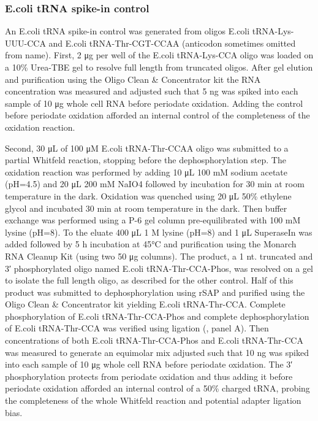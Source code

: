 \documentclass[9pt,lineno]{elife}
\begin{document}
\subsubsection{E.coli tRNA spike-in control}
An E.coli tRNA spike-in control was generated from oligos E.coli tRNA-Lys-UUU-CCA and E.coli tRNA-Thr-CGT-CCAA (anticodon sometimes omitted from name).
First, 2 μg per well of the E.coli tRNA-Lys-CCA oligo was loaded on a 10\% Urea-TBE gel to resolve full length from truncated oligos.
After gel elution and purification using the Oligo Clean \& Concentrator kit the RNA concentration was measured and adjusted such that 5 ng was spiked into each sample of 10 μg whole cell RNA before periodate oxidation.
Adding the control before periodate oxidation afforded an internal control of the completeness of the oxidation reaction.

Second, 30 μL of 100 μM E.coli tRNA-Thr-CCAA oligo was submitted to a partial Whitfeld reaction, stopping before the dephosphorylation step.
The oxidation reaction was performed by adding 10 μL 100 mM sodium acetate (pH=4.5) and 20 μL 200 mM NaIO4 followed by incubation for 30 min at room temperature in the dark.
Oxidation was quenched using 20 μL 50\% ethylene glycol and incubated 30 min at room temperature in the dark.
Then buffer exchange was performed using a P-6 gel column pre-equilibrated with 100 mM lysine (pH=8).
To the eluate 400 μL 1 M lysine (pH=8) and 1 μL SuperaseIn was added followed by 5 h incubation at 45°C and purification using the Monarch RNA Cleanup Kit (using two 50 μg columns).
The product, a 1 nt. truncated and 3′ phosphorylated oligo named E.coli tRNA-Thr-CCA-Phos, was resolved on a gel to isolate the full length oligo, as described for the other control.
Half of this product was submitted to dephosphorylation using rSAP and purified using the Oligo Clean \& Concentrator kit yielding E.coli tRNA-Thr-CCA.
Complete phosphorylation of E.coli tRNA-Thr-CCA-Phos and complete dephosphorylation of E.coli tRNA-Thr-CCA was verified using ligation (, panel A).
Then concentrations of both E.coli tRNA-Thr-CCA-Phos and E.coli tRNA-Thr-CCA was measured to generate an equimolar mix adjusted such that 10 ng was spiked into each sample of 10 μg whole cell RNA before periodate oxidation.
The 3′ phosphorylation protects from periodate oxidation and thus adding it before periodate oxidation afforded an internal control of a 50\% charged tRNA, probing the completeness of the whole Whitfeld reaction and potential adapter ligation bias.
\end{document}
